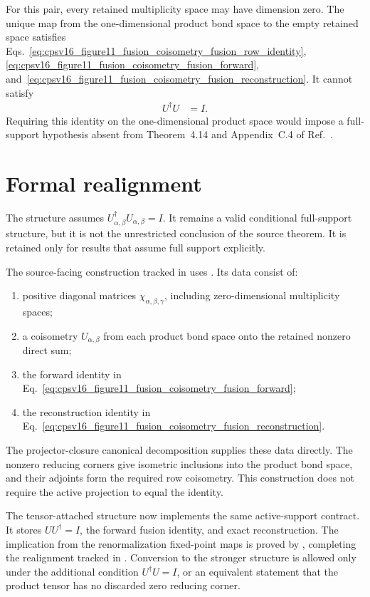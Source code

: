 \documentclass{article}
\begin{document}
For this pair, every retained multiplicity space may have dimension zero. The
unique map from the one-dimensional product bond space to the empty retained
space satisfies
Eqs.~\ref{eq:cpsv16_figure11_fusion_coisometry_fusion_row_identity},
\ref{eq:cpsv16_figure11_fusion_coisometry_fusion_forward},
and~\ref{eq:cpsv16_figure11_fusion_coisometry_fusion_reconstruction}. It
cannot satisfy
\begin{align}
    U^\dagger U
        &= I.
    \label{eq:cpsv16_figure11_fusion_coisometry_excluded_column_identity}
\end{align}
Requiring this identity on the one-dimensional product space would impose a
full-support hypothesis absent from Theorem~4.14 and Appendix~C.4 of
Ref.~\cite{Cirac2016MPDO_arXiv}.

\section{Formal realignment}

The structure  assumes
$U_{\alpha,\beta}^\dagger U_{\alpha,\beta}=I$. It remains a valid conditional
full-support structure, but it is not the unrestricted conclusion of the
source theorem. It is retained only for results that assume full support
explicitly.

The source-facing construction tracked in  uses
. Its data consist of:
\begin{enumerate}
    \item positive diagonal matrices
        $\chi_{\alpha,\beta,\gamma}$, including zero-dimensional multiplicity
        spaces;
    \item a coisometry $U_{\alpha,\beta}$ from each product bond space onto
        the retained nonzero direct sum;
    \item the forward identity in
        Eq.~\ref{eq:cpsv16_figure11_fusion_coisometry_fusion_forward};
    \item the reconstruction identity in
        Eq.~\ref{eq:cpsv16_figure11_fusion_coisometry_fusion_reconstruction}.
\end{enumerate}
The projector-closure canonical decomposition supplies these data directly.
The nonzero reducing corners give isometric inclusions into the product bond
space, and their adjoints form the required row coisometry. This construction
does not require the active projection to equal the identity.

The tensor-attached structure
 now implements the same active-support
contract. It stores $UU^\dagger=I$, the forward fusion identity, and exact
reconstruction. The implication from the renormalization fixed-point maps is
proved by
, completing the
realignment tracked in . Conversion to the stronger structure
 is allowed only under the additional
condition $U^\dagger U=I$, or an equivalent statement that the product tensor
has no discarded zero reducing corner.
\end{document}
